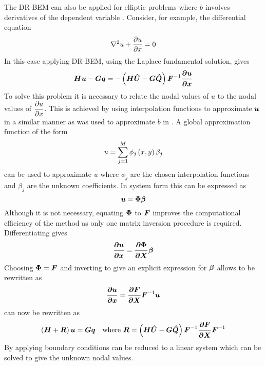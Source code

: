 The DR-BEM can also be applied for elliptic problems where
$b$ involves derivatives of the dependent variable
\cite{partridge:1992}. Consider, for example, the differential equation 
\begin{equation}
  \laplacian{}{u} + \delby{u}{x} = 0
\end{equation}
In this case applying DR-BEM, using the Laplace fundamental solution, gives
\begin{equation}
  \matr{H} \vect{u} - \matr{G} \vect{q} = - \pbrac{\matr{H} \matr{\hat{U}} -
    \matr{G} \matr{\hat{Q}}} \matr{F}^{-1} \vect{\delby{u}{x}}
\end{equation}
To solve this problem it is necessary to relate the nodal values of $u$ to
the nodal values of $ \dfrac{\partial u}{\partial x} $. This is achieved by
using interpolation functions to approximate $\vect{u}$ in a similar manner
as was used to approximate $b$ in .  A global
approximation function of the form
\begin{equation}
  u =  \displaystyle\sum_{j=1}^{M}   \phi_{j}\left( x,y \right)  \beta_{j}
\end{equation}
can be used to approximate $u$ where $\phi_{j}$ are the chosen
interpolation functions and $\beta_{j}$ are the unknown coefficients.  In
system form this can be expressed as
\begin{equation}
  \vect{u} = \matr{\Phi} \vect{\beta}
  \label{eq:uapprox}
\end{equation}
Although it is not necessary, equating $\matr{\Phi}$ to $\matr{F}$ 
improves the computational efficiency of the method as only one matrix 
inversion procedure is required. Differentiating  gives 
\begin{equation}
  \vect{\delby{u}{x}} = \matr{\delby{\Phi}{x}} \vect{\beta}
  \label{eq:uappder}
\end{equation}
Choosing $\matr{\Phi} = \matr{F}$ and inverting  to give an
explicit expression for $\vect{\beta}$ allows  to be
rewritten as
\begin{equation}
  \vect{\delby{u}{x}} = \matr{\delby{F}{x}} \matr{F}^{-1} \vect{u}
  \label{eq:dudxexp}
\end{equation}
 can now be rewritten as
\begin{equation}
  \pbrac{\matr{H} + \matr{R}} \vect{u} = \matr{G}
  \vect{q}\quad\text{where }\matr{R} = \pbrac{\matr{H} \matr{\hat{U}}
    - \matr{G} \matr{\hat{Q}}} \matr{F}^{-1} \matr{\delby{F}{x}}
  \matr{F}^{-1}
\label{eq:drmderiv}
\end{equation}
By applying boundary conditions  can be reduced to 
a linear system which can be solved to give the unknown nodal values.

